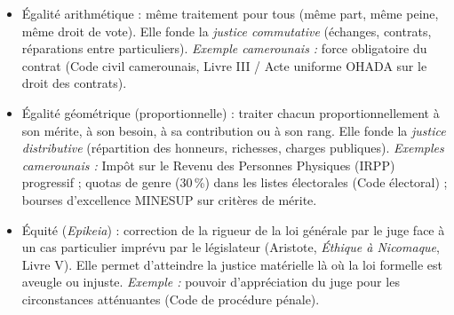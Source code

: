 \documentclass[11pt]{article}
\newcommand{\cle}[1]{{\popxbold\color{popdark}#1}}
\begin{document}
\begin{propriete}
\begin{itemize}
  \item \cle{Égalité arithmétique} : même traitement pour tous (même part, même peine, même droit de vote). Elle fonde la \emph{justice commutative} (échanges, contrats, réparations entre particuliers). \textit{Exemple camerounais :} force obligatoire du contrat (Code civil camerounais, Livre III / Acte uniforme OHADA sur le droit des contrats).
  \item \cle{Égalité géométrique (proportionnelle)} : traiter chacun proportionnellement à son mérite, à son besoin, à sa contribution ou à son rang. Elle fonde la \emph{justice distributive} (répartition des honneurs, richesses, charges publiques). \textit{Exemples camerounais :} Impôt sur le Revenu des Personnes Physiques (IRPP) progressif ; quotas de genre (30\,\%) dans les listes électorales (Code électoral) ; bourses d'excellence MINESUP sur critères de mérite.
  \item \cle{Équité (\emph{Epikeia})} : correction de la rigueur de la loi générale par le juge face à un cas particulier imprévu par le législateur (Aristote, \emph{Éthique à Nicomaque}, Livre V). Elle permet d'atteindre la justice matérielle là où la loi formelle est aveugle ou injuste. \textit{Exemple :} pouvoir d'appréciation du juge pour les circonstances atténuantes (Code de procédure pénale).
\end{itemize}
\end{propriete}
\end{document}
